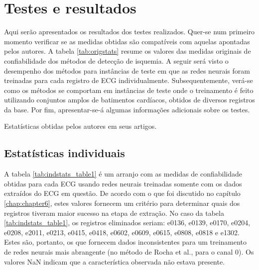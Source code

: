 
\chapter[Testes e resultados]{Testes e resultados}
\thispagestyle{empty}
\label{chap:chapter7}

Aqui serão apresentados os resultados dos testes realizados. Quer-se num primeiro momento verificar se as medidas obtidas são compatíveis com aquelas apontadas pelos autores. A tabela \ref{tab:origstats} resume os valores das medidas originais de confiabilidade dos métodos de detecção de isquemia. A seguir será visto o desempenho dos métodos para instâncias de teste em que as redes neurais foram treinadas para cada registro de ECG individualmente. Subsequentemente, verá-se como os métodos se comportam em instâncias de teste onde o treinamento é feito utilizando conjuntos amplos de batimentos cardíacos, obtidos de diversos registros da base. Por fim, apresentar-se-á algumas informações adicionais sobre os testes.

\begin{table}[ht!]
    \centering
    
    \caption[Estatísticas obtidas pelos autores em seus artigos]{Estatísticas obtidas pelos autores em seus artigos.}
    \label{tab:origstats}
\end{table}


\section{Estatísticas individuais}

A tabela \ref{tab:indstats_table1} é um arranjo com as medidas de confiabilidade obtidas para cada ECG usando redes neurais treinadas somente com os dados extraídos do ECG em questão. De acordo com o que foi discutido no capítulo \ref{chap:chapter6}, estes valores fornecem um critério para determinar quais dos registros tiveram maior sucesso na etapa de extração. No caso da tabela \ref{tab:indstats_table1}, os registros eliminados seriam: e0136, e0139, e0170, e0204, e0208, e2011, e0213, e0415, e0418, e0602, e0609, e0615, e0808, e0818 e e1302. Estes são, portanto, os que fornecem dados inconsistentes para um treinamento de redes neurais mais abrangente (no método de Rocha et al., para o canal 0). Os valores NaN indicam que a característica observada não estava presente.

